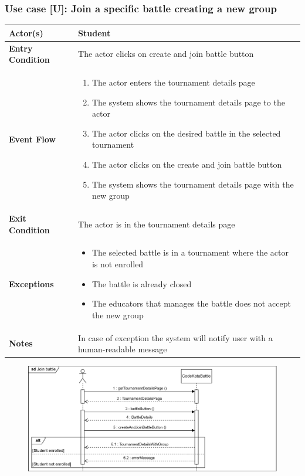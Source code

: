\documentclass[12pt, a4paper]{report}
\newcounter{useCase}
\newcommand{\usecase}[9]{
    \def\arraystretch{1.5} 
    \subsubsection*{Use case [U#2]: #3}
    \vspace*{0.2cm}
    \begin{center}
        \begin{tabular}{|l|p{12cm}|}
            \hline
            \textbf{Actor(s)} & #4 \\
            \hline
            \textbf{Entry Condition} & #5 \\
            \hline
            \textbf{Event Flow} & #6 \\
            \hline
            \textbf{Exit Condition} & #7 \\
            \hline
            \textbf{Exceptions} & #8 \\
            \hline
            \textbf{Notes} & #9 \\
            \hline
        \end{tabular}
    \end{center}
    #1
}
\begin{document}
    \usecase{\begin{figure}[H]\centering\includegraphics[width=0.9\linewidth]{images/joinbattle.png}\end{figure}}        
    {\arabic{useCase}\stepcounter{useCase}}
    {Join a specific battle creating a new group}
    {Student}
    {The actor clicks on create and join battle button}
    {
    \begin{enumerate}
        \item The actor enters the tournament details page
        \item The system shows the tournament details page to the actor
        \item The actor clicks on the desired battle in the selected tournament
        \item The actor clicks on the create and join battle button
        \item The system shows the tournament details page with the new group
    \end{enumerate}
    }
    {The actor is in the tournament details page}
    {
    \begin{itemize}
        \item The selected battle is in a tournament where the actor is not enrolled
        \item The battle is already closed
        \item The educators that manages the battle does not accept the new group
    \end{itemize}
    }
    {In case of exception the system will notify user with a human-readable message}
\end{document}
